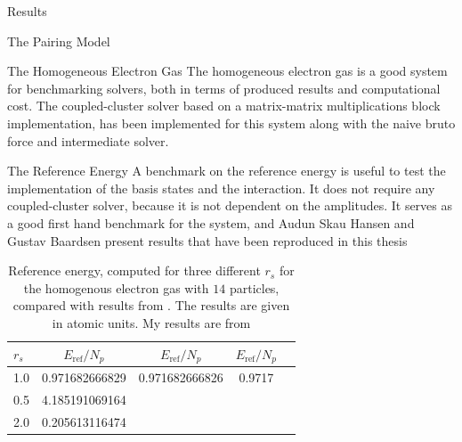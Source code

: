 \documentclass[twoside,english]{uiofysmaster}
\begin{document}
\begin{chapter}{Results}
\begin{section}{The Pairing Model}
	\end{section}

	\newpage

	\begin{section}{The Homogeneous Electron Gas}
		The homogeneous electron gas is a good system for benchmarking solvers, both in terms of produced results and computational cost. The coupled-cluster solver based on a matrix-matrix multiplications block implementation, has been implemented for this system along with the naive bruto force and intermediate solver. 

		\begin{subsection}{The Reference Energy}
			A benchmark on the reference energy is useful to test the implementation of the basis states and the interaction. It does not require any coupled-cluster solver, because it is not dependent on the amplitudes. It serves as a good first hand benchmark for the system, and Audun Skau Hansen and Gustav Baardsen \cite{Baardsen,Audun} present results that have been reproduced in this thesis
			\begin{table}[H]
				\begin{center}
					\begin{tabular}[center]{l | c  c  c  r}
						$r_s$ & $E_{\text{ref}} / N_p$ & $E_{\text{ref}} / N_p$ \cite{Baardsen} & $E_{\text{ref}} / N_p$ \cite{Audun} \\
						\hline
						1.0 & 0.971682666829 & 0.971682666826 & 0.9717 \\
						0.5 & 4.185191069164 &  &  \\
						2.0 & 0.205613116474 &  &  
					\end{tabular}
				\end{center}
				\caption{Reference energy, computed for three different $r_s$ for the homogenous electron gas with $14$ particles, compared with results from \cite{Baardsen,Audun}. The results are given in atomic units. My results are from \cite{WholmenGithub}}
				\label{table:ReferenceEnergyHEG}
			\end{table}

		\end{subsection}


\end{section}
\end{chapter}
\end{document}
